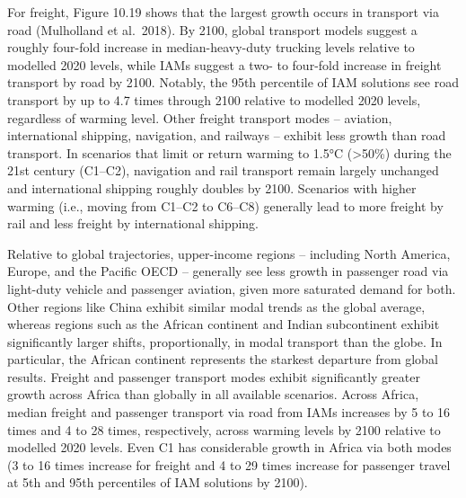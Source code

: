 \documentclass[
  letterpaper,
  DIV=11,
  numbers=noendperiod]{scrreprt}
\begin{document}
For freight, Figure 10.19 shows that the largest growth occurs in
transport via road (Mulholland et al.~2018). By 2100, global transport
models suggest a roughly four-fold increase in median-heavy-duty
trucking levels relative to modelled 2020 levels, while IAMs suggest a
two- to four-fold increase in freight transport by road by 2100.
Notably, the 95th percentile of IAM solutions see road transport by up
to 4.7 times through 2100 relative to modelled 2020 levels, regardless
of warming level. Other freight transport modes -- aviation,
international shipping, navigation, and railways -- exhibit less growth
than road transport. In scenarios that limit or return warming to 1.5°C
(\textgreater50\%) during the 21st century (C1--C2), navigation and rail
transport remain largely unchanged and international shipping roughly
doubles by 2100. Scenarios with higher warming (i.e., moving from C1--C2
to C6--C8) generally lead to more freight by rail and less freight by
international shipping.

Relative to global trajectories, upper-income regions -- including North
America, Europe, and the Pacific OECD -- generally see less growth in
passenger road via light-duty vehicle and passenger aviation, given more
saturated demand for both. Other regions like China exhibit similar
modal trends as the global average, whereas regions such as the African
continent and Indian subcontinent exhibit significantly larger shifts,
proportionally, in modal transport than the globe. In particular, the
African continent represents the starkest departure from global results.
Freight and passenger transport modes exhibit significantly greater
growth across Africa than globally in all available scenarios. Across
Africa, median freight and passenger transport via road from IAMs
increases by 5 to 16 times and 4 to 28 times, respectively, across
warming levels by 2100 relative to modelled 2020 levels. Even C1 has
considerable growth in Africa via both modes (3 to 16 times increase for
freight and 4 to 29 times increase for passenger travel at 5th and 95th
percentiles of IAM solutions by 2100).
\end{document}
